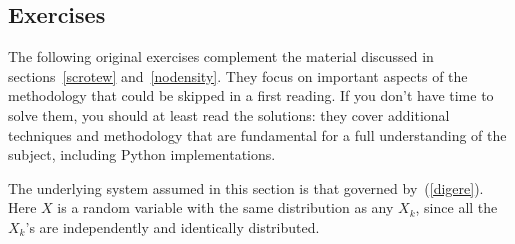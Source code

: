 \documentclass[oneside,10pt]{book}
\begin{document}




\subsection{Exercises}\label{jeporei}

The following original exercises complement the material discussed in sections~\ref{scrotew}
  and~\ref{nodensity}. They focus on important aspects of the methodology that could be skipped in a first reading. If you don't have time to solve them, you should at least read the solutions: they cover additional techniques
 and methodology that are fundamental for a full understanding of the subject, including Python implementations. 

The underlying system
 assumed in this section is that governed by~(\ref{digere}). Here $X$ is a random variable with the same
 distribution as any $X_k$, since  all the $X_k$'s are  
independently and identically distributed.

\pagebreak
\end{document}
